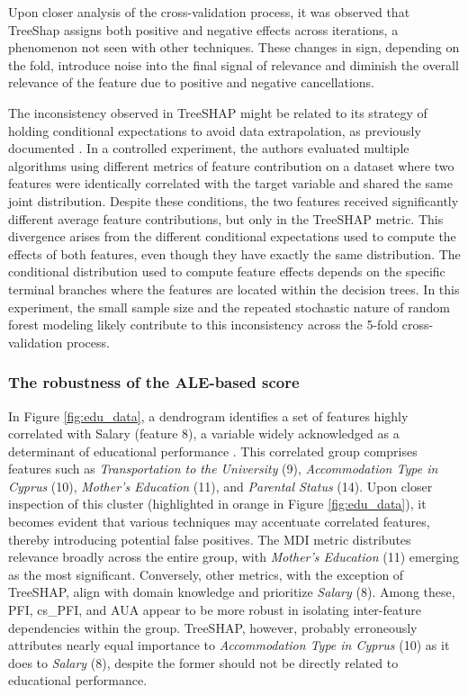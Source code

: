 Upon closer analysis of the cross-validation process, it was observed that TreeShap assigns both positive and negative effects across iterations, a phenomenon not seen with other techniques. These changes in sign, depending on the fold, introduce noise into the final signal of relevance and diminish the overall relevance of the feature due to positive and negative cancellations.

The inconsistency observed in TreeSHAP might be related to its strategy of holding conditional expectations to avoid data extrapolation, as previously documented \cite{SilvaFilho2023AAchievement}. In a controlled experiment, the authors evaluated multiple algorithms using different metrics of feature contribution on a dataset where two features were identically correlated with the target variable and shared the same joint distribution. Despite these conditions, the two features received significantly different average feature contributions, but only in the TreeSHAP metric. This divergence arises from the different conditional expectations used to compute the effects of both features, even though they have exactly the same distribution. The conditional distribution used to compute feature effects depends on the specific terminal branches where the features are located within the decision trees. In this experiment, the small sample size and the repeated stochastic nature of random forest modeling likely contribute to this inconsistency across the 5-fold cross-validation process.

\subsubsection{The robustness of the ALE-based score}

In Figure \ref{fig:edu_data}, a dendrogram identifies a set of features highly correlated with Salary (feature 8), a variable widely acknowledged as a determinant of educational performance \cite{coleman1968equality, coleman2019equality}. This correlated group comprises features such as \textit{Transportation to the University} (9), \textit{Accommodation Type in Cyprus} (10), \textit{Mother's Education} (11), and\textit{ Parental Status} (14). Upon closer inspection of this cluster (highlighted in orange in Figure \ref{fig:edu_data}), it becomes evident that various techniques may accentuate correlated features, thereby introducing potential false positives. The MDI metric distributes relevance broadly across the entire group, with \textit{Mother's Education} (11) emerging as the most significant. Conversely, other metrics, with the exception of TreeSHAP, align with domain knowledge and prioritize \textit{Salary} (8). Among these, PFI, cs\_PFI, and AUA appear to be more robust in isolating inter-feature dependencies within the group. TreeSHAP, however, probably erroneously attributes nearly equal importance to \textit{Accommodation Type in Cyprus} (10) as it does to \textit{Salary} (8), despite the former should not be directly related to educational performance.



